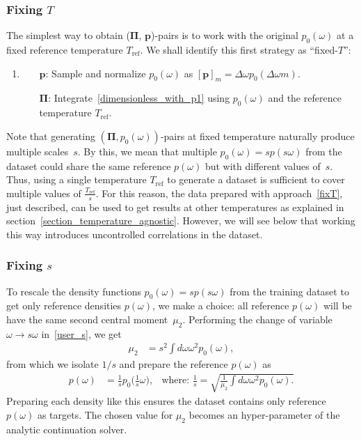 \documentclass[notitlepage, 11pt, nofootinbib]{revtex4-1}
\renewcommand{\vec}[1]{\bm{#1}}
\begin{document}
\subsubsection{Fixing $T$}
The simplest way to obtain ($\vec \Pi$, $\vec p$)-pairs is to work with the original $p_0(\omega)$ at a fixed reference temperature $T_{\text{ref}}$. We shall identify this first strategy as ``fixed-$T$'':
\begin{enumerate}
    \item \label{fixT}
    \begin{itemize}
        \item[$\vec p$:] Sample and normalize $p_0(\omega)$ as $[\vec p]_m = \Delta\omega p_0(\Delta\omega m)$.
        \item[$\vec \Pi$:] Integrate~\eqref{dimensionless_with_p1} using $p_0(\omega)$ and the reference temperature $T_{\text{ref}}$.
    \end{itemize}
\end{enumerate}
Note that generating $(\vec\Pi, p_0(\omega))$-pairs at fixed temperature naturally produce multiple scales~$s$. By this, we mean that multiple $p_0(\omega)=sp(s\omega)$ from the dataset could share the same reference $p(\omega)$ but with different values of~$s$.
Thus, using a single temperature $T_{\text{ref}}$ to generate a dataset is sufficient to cover multiple values of $\frac{T_{\text{ref}}}{s}$. For this reason, the data prepared with approach~\ref{fixT}, just described, can be used to get results at other temperatures as explained in section~\ref{section_temperature_agnostic}. However, we will see below that working this way introduces uncontrolled correlations in the dataset.


\subsubsection{Fixing $s$}
\label{sec_data_rescaling}
To rescale the density functions $p_0(\omega) = sp(s\omega)$ from the training dataset to get only reference densities $p(\omega)$, we make a choice: all reference $p(\omega)$ will be have the same second central moment~$\mu_2$. Performing the change of variable $\omega \rightarrow s\omega$ in~\eqref{user_s}, we get
\begin{align}
\mu_2&=
s^2 \int d\omega \omega^2 p_0(\omega),
\end{align}
from which we isolate $1/s$ and prepare the reference $p(\omega)$ as
\begin{align}
\label{eq_prep_ref}
p(\omega) 
&=
\frac{1}{s}p_0\big(\frac{1}{s}\omega\big),
&\text{where: }
\frac{1}{s}
=
\sqrt{
\frac{1}{\mu_2}
\int d\omega \omega^2 p_0(\omega).
}
\end{align}
Preparing each density like this ensures the dataset contains only reference $p(\omega)$ as targets. The chosen value for $\mu_2$ becomes an hyper-parameter of the analytic continuation solver.
\end{document}
